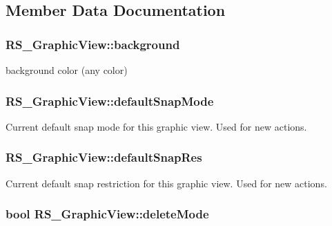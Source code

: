 \subsection{Member Data Documentation}
\hypertarget{classRS__GraphicView_a13f323ad576fa42d5c1003d025ea9f9a}{
\subsubsection[{background}]{ R\-S\-\_\-\-Graphic\-View\-::background\hspace{0.3cm}{\ttfamily [protected]}}}\label{classRS__GraphicView_a13f323ad576fa42d5c1003d025ea9f9a}
background color (any color) \hypertarget{classRS__GraphicView_aa018f550964aa34a859d0fbe36ddfd1d}{
\subsubsection[{default\-Snap\-Mode}]{ R\-S\-\_\-\-Graphic\-View\-::default\-Snap\-Mode\hspace{0.3cm}{\ttfamily [protected]}}}\label{classRS__GraphicView_aa018f550964aa34a859d0fbe36ddfd1d}
Current default snap mode for this graphic view. Used for new actions. \hypertarget{classRS__GraphicView_a3d48dce5acf1be807ecc8cb22416eb84}{
\subsubsection[{default\-Snap\-Res}]{ R\-S\-\_\-\-Graphic\-View\-::default\-Snap\-Res\hspace{0.3cm}{\ttfamily [protected]}}}\label{classRS__GraphicView_a3d48dce5acf1be807ecc8cb22416eb84}
Current default snap restriction for this graphic view. Used for new actions. \hypertarget{classRS__GraphicView_a2b1b20553b1fa0a2ae02d807a25a9ff2}{
\subsubsection[{delete\-Mode}]{\setlength{\rightskip}{0pt plus 5cm}bool R\-S\-\_\-\-Graphic\-View\-::delete\-Mode\hspace{0.3cm}{\ttfamily [protected]}}}\label{classRS__GraphicView_a2b1b20553b1fa0a2ae02d807a25a9ff2}

